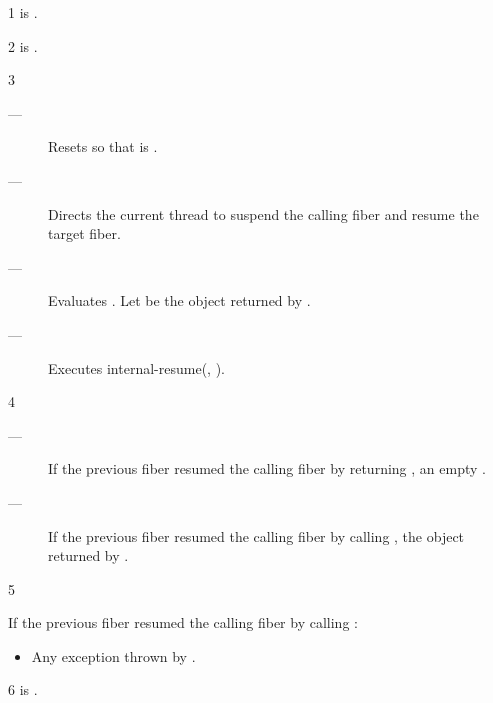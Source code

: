 1 \mandates
{} is \true.

2 \precond
\canresume is \true.

3 \effects
\begin{description}
    \item[---] Resets \state so that \emptyfn is \true.
    \item[---] Directs the current thread to suspend the calling fiber and resume
               the target fiber.
    \item[---] Evaluates .
               Let  be the \fiber object returned by .
    \item[---] Executes internal-resume(, ).
\end{description}

4 \returns

\begin{description}
    \item[---] If the previous fiber resumed the calling fiber by returning ,
          an empty \fiber.
    \item[---] If the previous fiber resumed the calling fiber by
          calling , the \fiber object returned
          by .
\end{description}

5 \except

If the previous fiber resumed the calling fiber by calling :
\begin{itemize}
    \item Any exception thrown by .
\end{itemize}


6 \postcond
\emptyfn is \true.



